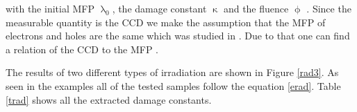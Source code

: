 \noindent
with the initial \ac{MFP} $\uplambda_0$, the damage constant $\upkappa$ and the fluence $\upphi$ \cite{felix}. Since the measurable quantity is the \ac{CCD} we make the assumption that the \ac{MFP} of electrons and holes are the same which was studied in \cite{felix}. Due to that one can find a relation of the \ac{CCD} to the \ac{MFP} .\par
The results of two different types of irradiation are shown in Figure \ref{rad3}. As seen in the examples all of the tested samples follow the equation \ref{erad}. Table \ref{trad} shows all the extracted damage constants.



